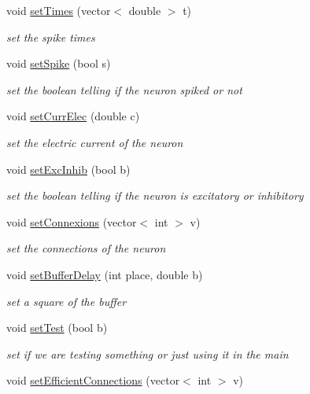 \begin{DoxyCompactItemize}
void \hyperlink{classNeuron_a46444e31c0b2cda937344b0a41ff59da}{set\-Times} (vector$<$ double $>$ t)
\begin{DoxyCompactList}\small\item\em set the spike times \end{DoxyCompactList}\item 
void \hyperlink{classNeuron_ab777b1ed93449f79293601ec2557e5ed}{set\-Spike} (bool s)
\begin{DoxyCompactList}\small\item\em set the boolean telling if the neuron spiked or not \end{DoxyCompactList}\item 
void \hyperlink{classNeuron_afe93c4d6b087e5d16220e0c0550fce01}{set\-Curr\-Elec} (double c)
\begin{DoxyCompactList}\small\item\em set the electric current of the neuron \end{DoxyCompactList}\item 
void \hyperlink{classNeuron_a47ee8e3d16f88abf78bee5a399f4a2be}{set\-Exc\-Inhib} (bool b)
\begin{DoxyCompactList}\small\item\em set the boolean telling if the neuron is excitatory or inhibitory \end{DoxyCompactList}\item 
void \hyperlink{classNeuron_ad5f0c6229057cd544d3828f15ae527a7}{set\-Connexions} (vector$<$ int $>$ v)
\begin{DoxyCompactList}\small\item\em set the connections of the neuron \end{DoxyCompactList}\item 
void \hyperlink{classNeuron_a666ab405d0710b81a0bb5167269bb2b8}{set\-Buffer\-Delay} (int place, double b)
\begin{DoxyCompactList}\small\item\em set a square of the buffer \end{DoxyCompactList}\item 
void \hyperlink{classNeuron_a7509fbae2081d1d8188938ca51352169}{set\-Test} (bool b)
\begin{DoxyCompactList}\small\item\em set if we are testing something or just using it in the main \end{DoxyCompactList}\item 
void \hyperlink{classNeuron_a5c88eb47ba197127e3a58c1a14269dff}{set\-Efficient\-Connections} (vector$<$ int $>$ v)

\end{DoxyCompactItemize}
